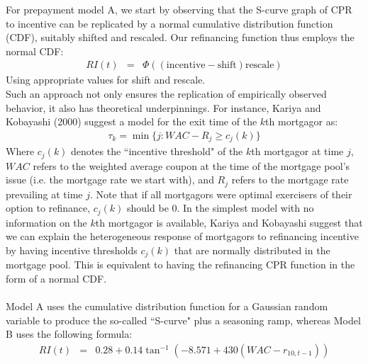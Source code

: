 \documentclass[10pt,letterpaper]{article}
\begin{document}
For prepayment model A, we start by observing that the S-curve graph of CPR to incentive can be replicated by a normal cumulative distribution function (CDF), suitably shifted and rescaled. Our refinancing function thus employs the normal CDF:
\begin{eqnarray}
RI(t) & = & \Phi((\text{incentive} - \text{shift})\text{rescale})
\end{eqnarray}
Using appropriate values for shift and rescale.\\
Such an approach not only ensures the replication of empirically observed behavior, it also has theoretical underpinnings.  For instance, Kariya and Kobayashi (2000) suggest a model for the exit time of the $k$th mortgagor as:
\begin{eqnarray}
\tau_k = \min \lbrace j : WAC - R_j \geq c_j(k) \rbrace
\end{eqnarray}
Where $c_j(k)$ denotes the ``incentive threshold" of the $k$th mortgagor at time $j$, $WAC$ refers to the weighted average coupon at the time of the mortgage pool's issue (i.e. the mortgage rate we start with), and $R_j$ refers to the mortgage rate prevailing at time $j$. Note that if all mortgagors were optimal exercisers of their option to refinance, $c_j(k)$ should be 0. In the simplest model with no information on the $k$th mortgagor is available, Kariya and Kobayashi suggest that we can explain the heterogeneous response of mortgagors to refinancing incentive by having incentive thresholds $c_j(k)$ that are normally distributed in the mortgage pool. This is equivalent to having the refinancing CPR function in the form of a normal CDF.\\
\\
Model A uses the cumulative distribution function for a Gaussian random variable to produce the so-called ``S-curve" plus a seasoning ramp, whereas Model B uses the following formula:
\begin{eqnarray}
RI(t) & = & 0.28 + 0.14 \tan^{-1} \left( -8.571 + 430 (WAC - {r_{10,t-1}}) \right)
\end{eqnarray}
\end{document}
